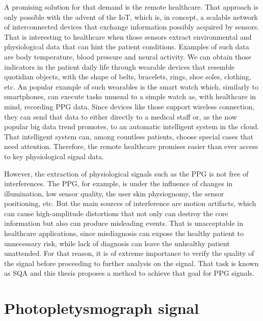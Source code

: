 A promising solution for that demand is the remote healthcare. That approach is only possible with the advent of the \gls{IoT}, which is, in concept, a scalable network of interconnected devices that exchange information possibly acquired by sensors. That is interesting to healthcare when those sensors extract environmental and physiological data that can hint the patient conditions. Examples of such data are body temperature, blood pressure and neural activity. We can obtain those indicators in the patient daily life through wearable devices that resemble quotidian objects, with the shape of belts, bracelets, rings, shoe soles, clothing, etc. An popular example of such wearables is the smart watch which, similarly to smartphones, can execute tasks unusual to a simple watch as, with healthcare in mind, recording \gls{PPG} data. Since devices like those support wireless connection, they can send that data to either directly to a medical staff or, as the now popular big data trend promotes, to an automatic intelligent system in the cloud. That intelligent system can, among countless patients, choose special cases that need attention. Therefore, the remote healthcare promises easier than ever access to key physiological signal data.  

However, the extraction of physiological signals such as the \gls{PPG} is not free of interferences. The \gls{PPG}, for example, is under the influence of changes in illumination, low sensor quality, the user skin physiognomy, the sensor positioning, etc. But the main sources of interference are motion artifacts, which can cause high-amplitude distortions that not only can destroy the core information but also can produce misleading events. That is unacceptable in healthcare applications, since misdiagnosis can expose the healthy patient to unnecessary risk, while lack of diagnosis can leave the unhealthy patient unattended. For that reason, it is of extreme importance to verify the quality of the signal before proceeding to further analysis on the signal. That task is known as \gls{SQA} and this thesis proposes a method to achieve that goal for \gls{PPG} signals.    

\section{Photopletysmograph signal}

